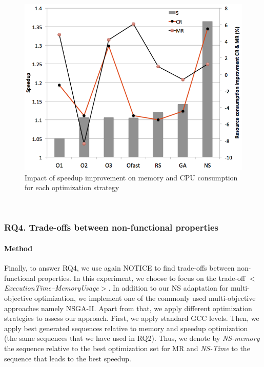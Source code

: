 \begin{figure}[h]
	\centering
	\includegraphics[width=1.\linewidth]{Ressources/rq3.png}
	\caption{Impact of speedup improvement on memory and CPU consumption for each optimization strategy}
\end{figure}

\noindent{}\\
\subsubsection{RQ4. Trade-offs between non-functional properties}
\paragraph{Method}

Finally, to answer RQ4, we use again NOTICE to find trade-offs between non-functional properties. In this experiment, we choose to focus on the trade-off \textit{$<$ExecutionTime--MemoryUsage$>$}. In addition to our NS adaptation for multi-objective optimization, we implement one of the commonly used multi-objective approaches namely NSGA-II. Apart from that, we apply different optimization strategies to assess our approach. First, we apply standard GCC levels. Then, we apply best generated sequences relative to memory and speedup optimization (the same sequences that we have used in RQ2). Thus, we denote by \textit{NS-memory} the sequence relative to the best optimization set for MR and \textit{NS-Time} to the sequence that leads to the best speedup. 

